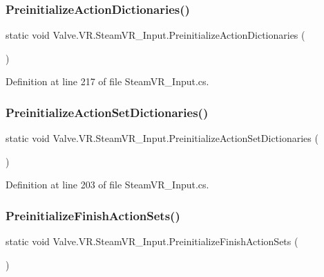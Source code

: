 \subsubsection{\texorpdfstring{PreinitializeActionDictionaries()}{PreinitializeActionDictionaries()}}
{\footnotesize\ttfamily static void Valve.\+V\+R.\+Steam\+V\+R\+\_\+\+Input.\+Preinitialize\+Action\+Dictionaries (\begin{DoxyParamCaption}{ }\end{DoxyParamCaption})\hspace{0.3cm}{\ttfamily [static]}}



Definition at line 217 of file Steam\+V\+R\+\_\+\+Input.\+cs.

\mbox{\label{class_valve_1_1_v_r_1_1_steam_v_r___input_a0f7555c8c991d837c557a0f875faa73c}} 
\subsubsection{\texorpdfstring{PreinitializeActionSetDictionaries()}{PreinitializeActionSetDictionaries()}}
{\footnotesize\ttfamily static void Valve.\+V\+R.\+Steam\+V\+R\+\_\+\+Input.\+Preinitialize\+Action\+Set\+Dictionaries (\begin{DoxyParamCaption}{ }\end{DoxyParamCaption})\hspace{0.3cm}{\ttfamily [static]}}



Definition at line 203 of file Steam\+V\+R\+\_\+\+Input.\+cs.

\mbox{\label{class_valve_1_1_v_r_1_1_steam_v_r___input_a84cea4c4f233d2a4c1576404af92c106}} 
\subsubsection{\texorpdfstring{PreinitializeFinishActionSets()}{PreinitializeFinishActionSets()}}
{\footnotesize\ttfamily static void Valve.\+V\+R.\+Steam\+V\+R\+\_\+\+Input.\+Preinitialize\+Finish\+Action\+Sets (\begin{DoxyParamCaption}{ }\end{DoxyParamCaption})\hspace{0.3cm}{\ttfamily [static]}}



